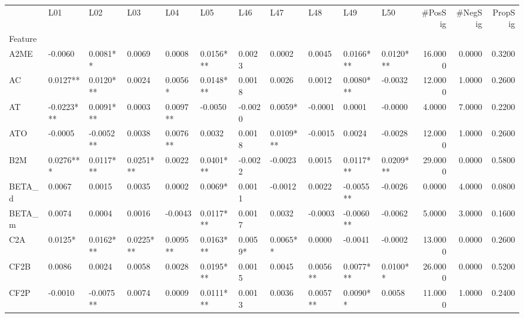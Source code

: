 \begin{tabular}{lllllllllllrrr}
\toprule
{} &         L01 &         L02 &         L03 &         L04 &         L05 &        L46 &         L47 &        L48 &         L49 &         L50 &  \#PosSig &  \#NegSig &  PropSig \\
Feature &             &             &             &             &             &            &             &            &             &             &          &          &          \\
\midrule
A2ME    &     -0.0060 &    0.0081** &      0.0069 &      0.0008 &   0.0156*** &     0.0023 &      0.0002 &     0.0045 &   0.0166*** &   0.0120*** &  16.0000 &   0.0000 &   0.3200 \\
AC      &    0.0127** &   0.0120*** &      0.0024 &     0.0056* &   0.0148*** &     0.0018 &      0.0026 &     0.0012 &   0.0080*** &     -0.0032 &  12.0000 &   1.0000 &   0.2600 \\
AT      &  -0.0223*** &   0.0091*** &      0.0003 &    0.0097** &     -0.0050 &    -0.0020 &     0.0059* &    -0.0001 &      0.0001 &     -0.0000 &   4.0000 &   7.0000 &   0.2200 \\
ATO     &     -0.0005 &   -0.0052** &      0.0038 &    0.0076** &      0.0032 &     0.0018 &   0.0109*** &    -0.0015 &      0.0024 &     -0.0028 &  12.0000 &   1.0000 &   0.2600 \\
B2M     &   0.0276*** &   0.0117*** &   0.0251*** &      0.0022 &   0.0401*** &    -0.0022 &     -0.0023 &     0.0015 &   0.0117*** &   0.0209*** &  29.0000 &   0.0000 &   0.5800 \\
BETA\_d  &      0.0067 &      0.0015 &      0.0035 &      0.0002 &     0.0069* &     0.0011 &     -0.0012 &     0.0022 &   -0.0055** &     -0.0026 &   0.0000 &   4.0000 &   0.0800 \\
BETA\_m  &      0.0074 &      0.0004 &      0.0016 &     -0.0043 &   0.0117*** &     0.0017 &      0.0032 &    -0.0003 &   -0.0060** &     -0.0062 &   5.0000 &   3.0000 &   0.1600 \\
C2A     &     0.0125* &   0.0162*** &   0.0225*** &    0.0095** &   0.0163*** &    0.0059* &    0.0065** &     0.0000 &     -0.0041 &     -0.0002 &  13.0000 &   0.0000 &   0.2600 \\
CF2B    &      0.0086 &      0.0024 &      0.0058 &      0.0028 &   0.0195*** &     0.0015 &      0.0045 &   0.0056** &   0.0077*** &    0.0100** &  26.0000 &   0.0000 &   0.5200 \\
CF2P    &     -0.0010 &   -0.0075** &      0.0074 &      0.0009 &   0.0111*** &     0.0013 &      0.0036 &   0.0057** &    0.0090** &      0.0058 &  11.0000 &   1.0000 &   0.2400 \\

\end{tabular}
